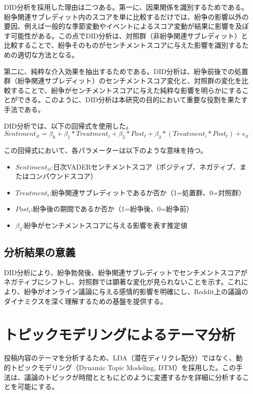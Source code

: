 \documentclass[11pt, a4j]{jreport}
\begin{document}
    DID分析を採用した理由は二つある。第一に、因果関係を識別するためである。紛争関連サブレディット内のスコアを単に比較するだけでは、紛争の影響以外の要因、例えば一般的な季節変動やイベントによるスコア変動が結果に影響を及ぼす可能性がある。この点でDID分析は、対照群（非紛争関連サブレディット）と比較することで、紛争そのものがセンチメントスコアに与えた影響を識別するための適切な方法となる。
    
    第二に、純粋な介入効果を抽出するためである。DID分析は、紛争前後での処置群（紛争関連サブレディット）のセンチメントスコア変化と、対照群の変化を比較することで、紛争がセンチメントスコアに与えた純粋な影響を明らかにすることができる。このように、DID分析は本研究の目的において重要な役割を果たす手法である。

    DID分析では、以下の回帰式を使用した。
    \begin{equation}
        Sentiment_{it} = \beta_{0} + \beta_{1}*Treatment_{i} + \beta_{2}*Post_{t} + \beta_{3}*(Treatment_{i} * Post_{t}) + \epsilon_{it}
    \end{equation}

    この回帰式において、各パラメーターは以下のような意味を持つ。
    \begin{itemize}
        \item $Sentiment_{it}$:日次VADERセンチメントスコア（ポジティブ、ネガティブ、またはコンパウンドスコア）
        \item $Treatment_{i}$:紛争関連サブレディットであるか否か（1=処置群、0=対照群）
        \item $Post_{t}$:紛争後の期間であるか否か（1=紛争後、0=紛争前）
        \item $\beta_{3}$:紛争がセンチメントスコアに与える影響を表す推定値
    \end{itemize}

    \subsection{分析結果の意義}
    DID分析により、紛争勃発後、紛争関連サブレディットでセンチメントスコアがネガティブにシフトし、対照群では顕著な変化が見られないことを示す。これにより、紛争がオンライン議論に与える感情的影響を明確にし、Reddit上の議論のダイナミクスを深く理解するための基盤を提供する。

    \section{トピックモデリングによるテーマ分析}
    投稿内容のテーマを分析するため、LDA（潜在ディリクレ配分）ではなく、動的トピックモデリング（Dynamic Topic Modeling, DTM）を採用した。この手法は、議論のトピックが時間とともにどのように変遷するかを詳細に分析することを可能にする。
\end{document}
